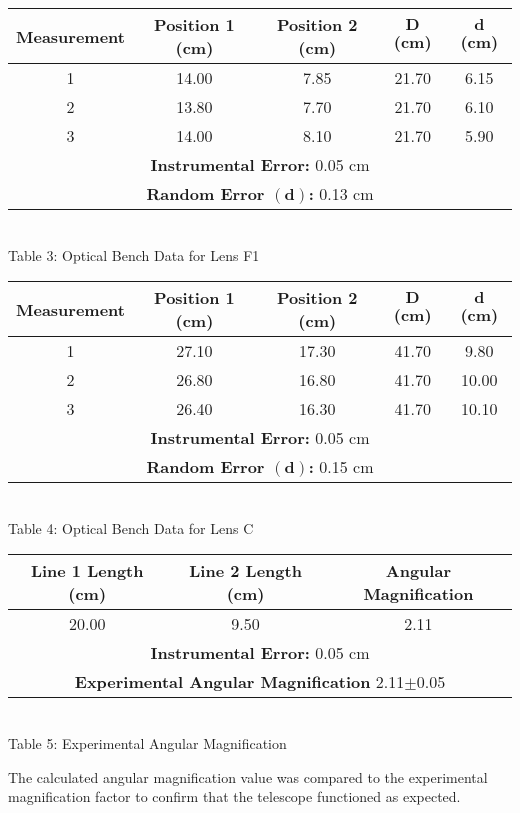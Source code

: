 \begin{center}
    \begin{tabular}{|c|c|c|c|c|}
        \hline
    \textbf{Measurement} & \textbf{Position 1 (cm)} & \textbf{Position 2 (cm)} & $\bm{D}$\textbf{ (cm)} & $\bm{d}$\textbf{ (cm)} \\ \hline
        1 & 14.00 & 7.85 & 21.70 & 6.15\\ 
        2 & 13.80 & 7.70 & 21.70 & 6.10\\ 
        3 & 14.00 & 8.10 & 21.70 & 5.90\\  \hline
        \multicolumn{5}{|c|}{\textbf{Instrumental Error:} 0.05 cm} \\
        \multicolumn{5}{|c|}{\textbf{Random Error $\bm{(d)}$:} 0.13 cm} \\
        \hline
    \end{tabular}
    \vspace{3mm}
    \\Table 3: Optical Bench Data for Lens F1\\
    \vspace{5mm}

    \begin{tabular}{|c|c|c|c|c|}
        \hline
        \textbf{Measurement} & \textbf{Position 1 (cm)} & \textbf{Position 2 (cm)} & $\bm{D}$\textbf{ (cm)} & $\bm{d}$\textbf{ (cm)} \\ \hline
        1 & 27.10 & 17.30 & 41.70 & 9.80\\ 
        2 & 26.80 & 16.80 & 41.70 & 10.00\\ 
        3 & 26.40 & 16.30 & 41.70 & 10.10\\  \hline
        \multicolumn{5}{|c|}{\textbf{Instrumental Error:} 0.05 cm} \\
        \multicolumn{5}{|c|}{\textbf{Random Error $\bm{(d)}$:} 0.15 cm} \\
        \hline
    \end{tabular}
    \vspace{3mm}
    \\Table 4: Optical Bench Data for Lens C\\
    \vspace{10mm}
    \begin{tabular}{|c|c|c|}
        \hline
        \textbf{Line 1 Length (cm)} & \textbf{Line 2 Length (cm)} & \textbf{Angular Magnification} \\ \hline
        20.00 & 9.50 & 2.11 \\ \hline
        \multicolumn{3}{|c|}{\textbf{Instrumental Error:} 0.05 cm} \\ 
        \multicolumn{3}{|c|}{\textbf{Experimental Angular Magnification} 2.11$\pm$0.05} \\ \hline
    \end{tabular}
    \vspace{3mm}
    \\Table 5: Experimental Angular Magnification\\
\end{center}
The calculated angular magnification value was compared to the experimental magnification factor to confirm that the telescope functioned as expected.